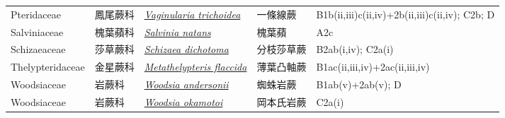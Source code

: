 {\begin{longtable}{p{2.5cm}p{2.5cm}p{4.5cm}p{2.5cm}p{3cm}}
    Pteridaceae & 鳳尾蕨科 & \href{http://www.theplantlist.org/tpl1.1/search?q=Vaginularia+trichoidea}{\textit{Vaginularia trichoidea} } & 一條線蕨 & B1b(ii,iii)c(ii,iv)+2b(ii,iii)c(ii,iv); C2b; D \index{Vaginularia@\textit{Vaginularia}!trichoidea@\textit{trichoidea}}  \index{一條線蕨} \\
    Salviniaceae & 槐葉蘋科 & \href{http://www.theplantlist.org/tpl1.1/search?q=Salvinia+natans}{\textit{Salvinia natans} } & 槐葉蘋 & A2c \index{Salvinia@\textit{Salvinia}!natans@\textit{natans}}  \index{槐葉蘋} \\
    Schizaeaceae & 莎草蕨科 & \href{http://www.theplantlist.org/tpl1.1/search?q=Schizaea+dichotoma}{\textit{Schizaea dichotoma} } & 分枝莎草蕨 & B2ab(i,iv); C2a(i) \index{Schizaea@\textit{Schizaea}!dichotoma@\textit{dichotoma}}  \index{分枝莎草蕨} \\
    Thelypteridaceae & 金星蕨科 & \href{http://www.theplantlist.org/tpl1.1/search?q=Metathelypteris+flaccida}{\textit{Metathelypteris flaccida} } & 薄葉凸軸蕨 & B1ac(ii,iii,iv)+2ac(ii,iii,iv) \index{Metathelypteris@\textit{Metathelypteris}!flaccida@\textit{flaccida}}  \index{薄葉凸軸蕨} \\
    Woodsiaceae & 岩蕨科 & \href{http://www.theplantlist.org/tpl1.1/search?q=Woodsia+andersonii}{\textit{Woodsia andersonii} } & 蜘蛛岩蕨 & B1ab(v)+2ab(v); D \index{Woodsia@\textit{Woodsia}!andersonii@\textit{andersonii}}  \index{蜘蛛岩蕨} \\
    Woodsiaceae & 岩蕨科 & \href{http://www.theplantlist.org/tpl1.1/search?q=Woodsia+okamotoi}{\textit{Woodsia okamotoi} } & 岡本氏岩蕨 & C2a(i) \index{Woodsia@\textit{Woodsia}!okamotoi@\textit{okamotoi}}  \index{岡本氏岩蕨} \\
    \bottomrule
        \end{longtable}
        }
    